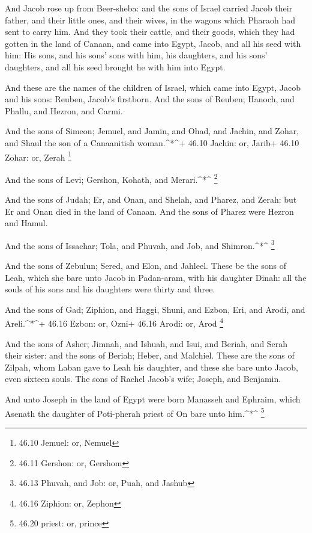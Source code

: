  And Jacob rose up from Beer-sheba: and the sons of Israel
carried Jacob their father, and their little ones, and their wives, in
the wagons which Pharaoh had sent to carry him.  And they
took their cattle, and their goods, which they had gotten in the land of
Canaan, and came into Egypt, Jacob, and all his seed with him:
 His sons, and his sons' sons with him, his daughters, and
his sons' daughters, and all his seed brought he with him into Egypt.

 And these are the names of the children of Israel, which
came into Egypt, Jacob and his sons: Reuben, Jacob's firstborn.
 And the sons of Reuben; Hanoch, and Phallu, and Hezron, and
Carmi.

 And the sons of Simeon; Jemuel, and Jamin, and Ohad, and
Jachin, and Zohar, and Shaul the son of a Canaanitish woman.\^{}*\^{}+
46.10 Jachin: or, Jarib+ 46.10 Zohar: or, Zerah \footnote{46.10 Jemuel:
  or, Nemuel}

 And the sons of Levi; Gershon, Kohath, and
Merari.\^{}*\^{} \footnote{46.11 Gershon: or, Gershom}

 And the sons of Judah; Er, and Onan, and Shelah, and
Pharez, and Zerah: but Er and Onan died in the land of Canaan. And the
sons of Pharez were Hezron and Hamul.

 And the sons of Issachar; Tola, and Phuvah, and Job, and
Shimron.\^{}*\^{} \footnote{46.13 Phuvah, and Job: or, Puah, and Jashub}

 And the sons of Zebulun; Sered, and Elon, and Jahleel.
 These be the sons of Leah, which she bare unto Jacob in
Padan-aram, with his daughter Dinah: all the souls of his sons and his
daughters were thirty and three.

 And the sons of Gad; Ziphion, and Haggi, Shuni, and Ezbon,
Eri, and Arodi, and Areli.\^{}*\^{}+ 46.16 Ezbon: or, Ozni+ 46.16 Arodi:
or, Arod \footnote{46.16 Ziphion: or, Zephon}

 And the sons of Asher; Jimnah, and Ishuah, and Isui, and
Beriah, and Serah their sister: and the sons of Beriah; Heber, and
Malchiel.  These are the sons of Zilpah, whom Laban gave to
Leah his daughter, and these she bare unto Jacob, even sixteen souls.
 The sons of Rachel Jacob's wife; Joseph, and Benjamin.

 And unto Joseph in the land of Egypt were born Manasseh
and Ephraim, which Asenath the daughter of Poti-pherah priest of On bare
unto him.\^{}*\^{} \footnote{46.20 priest: or, prince}

